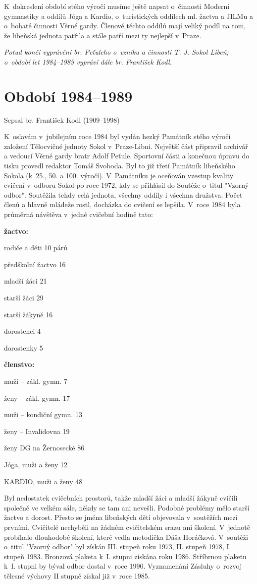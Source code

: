 \documentclass[a5paper, 11pt, twoside]{article}
\begin{document}
K~dokreslení období stého výročí musíme ještě napsat o~činnosti Moderní
gymnastiky a oddílů Jóga a Kardio, o~turistických oddílech ml. žactva a
JILMu a o~bohaté činnosti Věrné gardy. Členové těchto oddílů mají veliký
podíl na tom, že libeňská jednota patřila a stále patří mezi ty nejlepší
v~Praze.

\textit{Potud končí vyprávění br. Peťuleho o~vzniku a činnosti T. J. Sokol
Libeň; o~období let 1984--1989 vypráví dále br. František Kodl.}

\section{Období 1984--1989}

Sepsal br. František Kodl (1909--1998)

K~oslavám v~jubilejním roce 1984 byl vydán hezký Památník stého výročí
založení Tělocvičné jednoty Sokol v~Praze-Libni. Největší část připravil
archivář a vedoucí Věrné gardy bratr Adolf Peťule. Sportovní části a
konečnou úpravu do tisku provedl redaktor Tomáš Svoboda. Byl to již
třetí Památník libeňského Sokola (k~25., 50. a 100. výročí). V~Památníku
je oceňován vzestup kvality cvičení v~odboru Sokol po roce 1972, kdy se
přihlásil do Soutěže o~titul "Vzorný odbor". Soutěžila tehdy celá
jednota, všechny oddíly i všechna družstva. Počet členů a hlavně mládeže
rostl, docházka do cvičení se lepšila. V~roce 1984 byla průměrná
návštěva v~jedné cvičební hodině tato:

\textbf{žactvo:}

rodiče a děti 10 párů

předškolní žactvo 16

mladší žáci 21

starší žáci 29

starší žákyně 16

dorostenci 4

dorostenky 5

\textbf{členstvo:}

muži -- zákl. gymn. 7

ženy -- zákl. gymn. 17

muži -- kondiční gymn. 13

ženy -- Invalidovna 19

ženy DG na Žernosecké 86

Jóga, muži a ženy 12

KARDIO, muži a ženy 48

Byl nedostatek cvičebních prostorů, takže mladší žáci a mladší žákyně
cvičili společně ve velkém sále, někdy se tam ani nevešli. Podobné
problémy mělo starší žactvo a dorost. Přesto se jména libeňských dětí
objevovala v~soutěžích mezi prvními. Cvičitelé nechyběli na žádném
cvičitelském srazu ani školení. V~jednotě probíhalo dlouhodobé školení,
které vedla metodička Dáša Horáčková. V~soutěži o~titul "Vzorný odbor"
byl získán III. stupeň roku 1973, II. stupeň 1978, I. stupeň 1983.
Bronzová plaketa k~I. stupni získána roku 1986. Stříbrnou plaketu k~I.
stupni by býval odbor dostal v~roce 1990. Vyznamenání Zásluhy o~rozvoj
tělesné výchovy II stupně získal již v~roce 1985.
\end{document}
